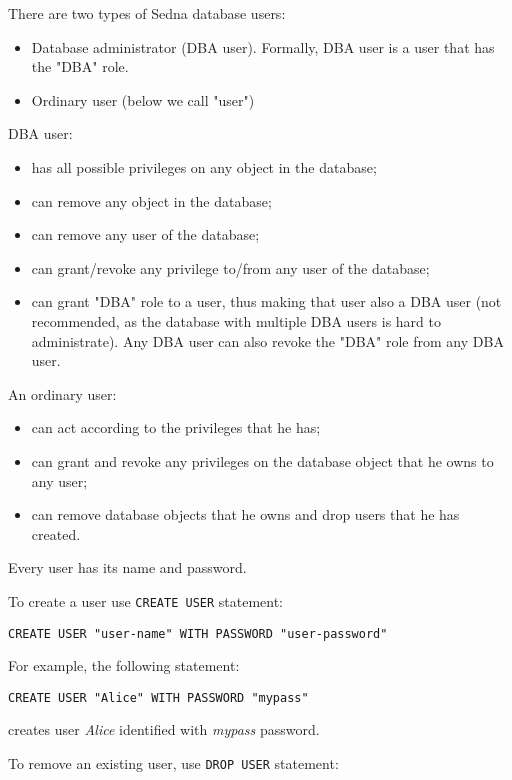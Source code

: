 \documentclass[a4paper,12pt]{article}
\newenvironment{citemize}
{\begin{itemize}
  \setlength{\itemsep}{0pt}
  \setlength{\parskip}{0pt}
  \setlength{\parsep}{0pt}}
{\end{itemize}}
\begin{document}
There are two types of Sedna database users:

\begin{citemize}
\item Database administrator (DBA user). Formally, DBA user is a user that has
the "DBA" role.
\item Ordinary user (below we call "user")
\end{citemize}

DBA user:
\begin{citemize}
\item has all possible privileges on any object in the database;
\item can remove any object in the database;
\item can remove any user of the database;
\item can grant/revoke any privilege to/from any user of the database;
\item can grant "DBA" role to a user, thus making that user also a DBA user
(not recommended, as the database with multiple DBA users is hard to
administrate). Any DBA user can also revoke the "DBA" role from any DBA user.
\end{citemize}

An ordinary user:
\begin{citemize}
\item can act according to the privileges that he has;
\item can grant and revoke any privileges on the database object that he owns
to any user;
\item can remove database objects that he owns and drop users that he has
created.
\end{citemize}

Every user has its name and password.

To create a user use \verb!CREATE USER! statement:

\begin{verbatim}
CREATE USER "user-name" WITH PASSWORD "user-password"
\end{verbatim}

For example, the following statement:

\begin{verbatim}
CREATE USER "Alice" WITH PASSWORD "mypass"
\end{verbatim}

creates user \emph{Alice} identified with \emph{mypass} password.

To remove an existing user, use \verb!DROP USER! statement:
\end{document}
